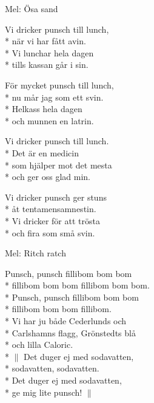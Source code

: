 \begin{SongText}[Studiemedelsrundo]
    \begin{SongInfo}
        Mel: Ösa sand
    \end{SongInfo}
    \begin{SongVerse}
        Vi dricker punsch till lunch,\\*%
        när vi har fått avin.\\*%
        Vi lunchar hela dagen\\*%
        tills kassan går i sin.
    \end{SongVerse}
    \begin{SongVerse}
        För mycket punsch till lunch,\\*%
        nu mår jag som ett svin.\\*%
        Helkass hela dagen\\*%
        och munnen en latrin.
    \end{SongVerse}
    \begin{SongVerse}
        Vi dricker punsch till lunch.\\*%
        Det är en medicin\\*%
        som hjälper mot det mesta\\*%
        och ger oss glad min.
    \end{SongVerse}
    \begin{SongVerse}
        Vi dricker punsch ger stuns\\*%
        åt tentamensamnestin.\\*%
        Vi dricker för att trösta\\*%
        och fira som små svin.
    \end{SongVerse}\end{SongText}
\begin{SongText}
    \begin{SongInfo}
        Mel: Ritch ratch
    \end{SongInfo}
    \begin{SongVerse}
        Punsch, punsch fillibom bom bom\\*%
        fillibom bom bom fillibom bom bom.\\*%
        Punsch, punsch fillibom bom bom\\*%
        fillibom bom bom fillibom.\\*%
        Vi har ju både Cederlunds och\\*%
        Carlshamns flagg, Grönstedts blå\\*%
        och lilla Caloric.\\*%
        $\|$ Det duger ej med sodavatten,\\*%
        sodavatten, sodavatten.\\*%
        Det duger ej med sodavatten,\\*%
        ge mig lite punsch! $\|$
    \end{SongVerse}\end{SongText}
